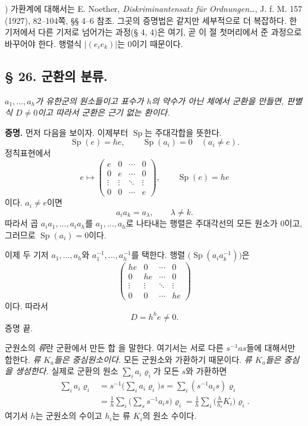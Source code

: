 {\footnotesize{}) 가환계에 대해서는 E. Noether, \emph{Diskriminantensatz für Ordnungen\ldots}, J. f. M. 157 (1927), 82--104쪽, §§ 4--6 참조. 그곳의 증명법은 같지만 세부적으로 더 복잡하다. 한 기저에서 다른 기저로 넘어가는 과정(§ 4, 4)은 여기, 곧 이 절 첫머리에서 준 과정으로 바꾸어야 한다. 행렬식 \(\left|(e_i e_k)\right|\)는 0이기 때문이다.\par}

\subsection*{§ 26. 군환의 분류.}

\noindent\emph{\(a_1,\ldots,a_h\)가 유한군의 원소들이고 표수가 \(h\)의 약수가 아닌 체에서 군환을 만들면, 판별식 \(D\ne0\)이고 따라서 군환은 근기 없는 환이다.}

\textbf{증명.} 먼저 다음을 보이자. 이제부터 \(\operatorname{Sp}\)는 주대각합을 뜻한다.
\[
        \operatorname{Sp}(e)=he,
        \qquad
        \operatorname{Sp}(a_i)=0\quad(a_i\ne e).
\]
정칙표현에서
\[
e\longmapsto
\begin{pmatrix}
e&0&\cdots&0\\
0&e&\cdots&0\\
\vdots&\vdots&\ddots&\vdots\\
0&0&\cdots&e
\end{pmatrix},
\qquad
\operatorname{Sp}(e)=he
\]
이다. \(a_i\ne e\)이면
\[
        a_i a_k=a_\lambda,
        \qquad \lambda\ne k.
\]
따라서 곱 \(a_i a_1,\ldots,a_i a_h\)를 \(a_1,\ldots,a_h\)로 나타내는 행렬은 주대각선의 모든 원소가 0이고, 그러므로 \(\operatorname{Sp}(a_i)=0\)이다.

이제 두 기저 \(a_1,\ldots,a_h\)와 \(a_1^{-1},\ldots,a_h^{-1}\)를 택한다. 행렬 \(\bigl(\operatorname{Sp}(a_i a_k^{-1})\bigr)\)은
\[
\begin{pmatrix}
he&0&\cdots&0\\
0&he&\cdots&0\\
\vdots&\vdots&\ddots&\vdots\\
0&0&\cdots&he
\end{pmatrix}
\]
이다. 따라서
\[
        D=h^h e\ne0.
\]
증명 끝.

군원소의 \emph{류}란 군환에서 만든 합
을 말한다. 여기서는 서로 다른 \(s^{-1}as\)들에 대해서만 합한다. \emph{류 \(K_a\)들은 중심원소이다.} 모든 군원소와 가환하기 때문이다. \emph{류 \(K_a\)들은 중심을 생성한다.} 실제로 군환의 원소 \(\sum_i a_i\varrho_i\)가 모든 \(s\)와 가환하면
\[
\begin{aligned}
\sum_i a_i\varrho_i
&=s^{-1}\biggl(\sum_i a_i\varrho_i\biggr)s
 =\sum_i(s^{-1}a_i s)\varrho_i\\
&=\frac1h\sum_i\biggl(\sum_s s^{-1}a_i s\biggr)\varrho_i
 =\frac1h\sum_i\biggl(\frac h{h_i}K_i\biggr)\varrho_i.
\end{aligned}
\]
여기서 \(h\)는 군원소의 수이고 \(h_i\)는 류 \(K_i\)의 원소 수이다.

